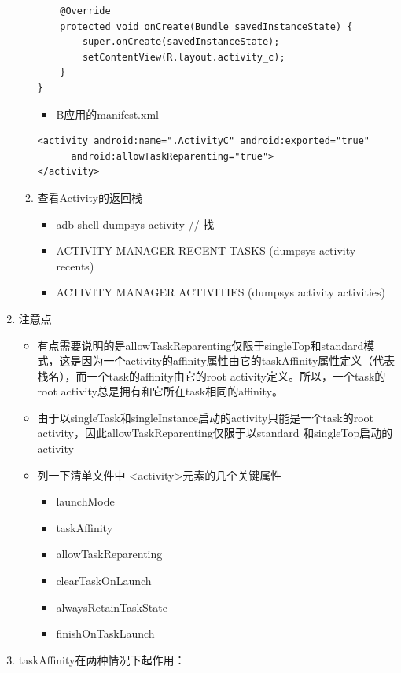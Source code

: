 \documentclass[9pt, b5paaper]{book}
\begin{document}
\begin{enumerate}
\begin{enumerate}
\begin{verbatim}
    @Override
    protected void onCreate(Bundle savedInstanceState) {
        super.onCreate(savedInstanceState);
        setContentView(R.layout.activity_c);
    }
}
\end{verbatim}
\begin{itemize}
\item B应用的manifest.xml
\end{itemize}
\begin{verbatim}
<activity android:name=".ActivityC" android:exported="true"    
      android:allowTaskReparenting="true">
</activity>
\end{verbatim}
\item 查看Activity的返回栈
\label{sec-4-9-2-1-2}
\begin{itemize}
\item adb shell dumpsys activity // 找
\item ACTIVITY MANAGER RECENT TASKS (dumpsys activity recents)
\item ACTIVITY MANAGER ACTIVITIES (dumpsys activity activities)
\end{itemize}
\end{enumerate}
\item 注意点
\label{sec-4-9-2-2}
\begin{itemize}
\item 有点需要说明的是allowTaskReparenting仅限于singleTop和standard模式，这是因为一个activity的affinity属性由它的taskAffinity属性定义（代表栈名），而一个task的affinity由它的root activity定义。所以，一个task的root activity总是拥有和它所在task相同的affinity。
\item 由于以singleTask和singleInstance启动的activity只能是一个task的root activity，因此allowTaskReparenting仅限于以standard 和singleTop启动的activity
\item 列一下清单文件中 <activity>元素的几个关键属性
\begin{itemize}
\item launchMode
\item taskAffinity
\item allowTaskReparenting
\item clearTaskOnLaunch
\item alwaysRetainTaskState
\item finishOnTaskLaunch
\end{itemize}
\end{itemize}
\item taskAffinity在两种情况下起作用：
\label{sec-4-9-2-3}
\begin{enumerate}

\end{enumerate}
\end{enumerate}
\end{document}

